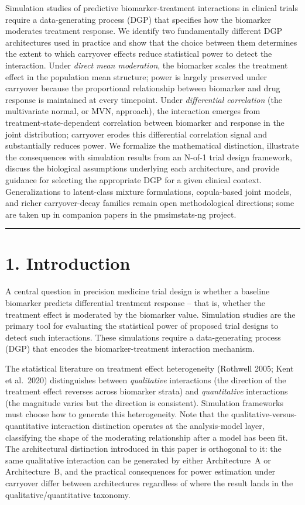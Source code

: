 \documentclass[
]{article}
\begin{document}
Simulation studies of predictive biomarker-treatment interactions
in clinical trials require a data-generating process (DGP) that
specifies how the biomarker moderates treatment response. We
identify two fundamentally different DGP architectures used in
practice and show that the choice between them determines the
extent to which carryover effects reduce statistical power to
detect the interaction. Under \textit{direct mean moderation}, the
biomarker scales the treatment effect in the population mean
structure; power is largely preserved under carryover because the
proportional relationship between biomarker and drug response is
maintained at every timepoint. Under \textit{differential
correlation} (the multivariate normal, or MVN, approach), the interaction emerges from treatment-state-dependent
correlation between biomarker and response in the joint
distribution; carryover erodes this differential correlation signal
and substantially reduces power. We formalize the mathematical
distinction, illustrate the consequences with simulation results
from an N-of-1 trial design framework, discuss the biological
assumptions underlying each architecture, and provide guidance for
selecting the appropriate DGP for a given clinical context. \textcolor{addblue}{Generalizations to latent-class mixture formulations, copula-based joint models, and richer carryover-decay families remain open methodological directions; some are taken up in companion papers in the pmsimstats-ng project.}

\bigskip\noindent

\rule{\textwidth}{0.4pt}\bigskip

\section{1. Introduction}

A central question in precision medicine trial design is whether a
baseline biomarker predicts differential treatment response -- that
is, whether the treatment effect is moderated by the biomarker
value. Simulation studies are the primary tool for evaluating the
statistical power of proposed trial designs to detect such
interactions. These simulations require a data-generating process
(DGP) that encodes the biomarker-treatment interaction mechanism.

The statistical literature on treatment effect heterogeneity
(Rothwell 2005; Kent et al.~2020) distinguishes between
\textit{qualitative} interactions (the direction of the treatment
effect reverses across biomarker strata) and \textit{quantitative}
interactions (the magnitude varies but the direction is
consistent). Simulation frameworks must choose how to generate
this heterogeneity. \textcolor{addblue}{Note that the qualitative-versus-quantitative interaction distinction operates at the analysis-model layer, classifying the shape of the moderating relationship after a model has been fit. The architectural distinction introduced in this paper is orthogonal to it: the same qualitative interaction can be generated by either Architecture~A or Architecture~B, and the practical consequences for power estimation under carryover differ between architectures regardless of where the result lands in the qualitative/quantitative taxonomy.}
\end{document}
